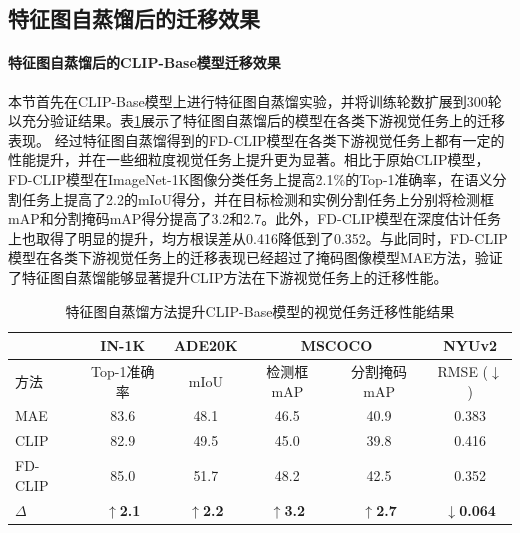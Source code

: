 \subsection{特征图自蒸馏后的迁移效果}
\label{sec:fd-exp-clip}
\paragraph{特征图自蒸馏后的CLIP-Base模型迁移效果} 本节首先在CLIP-Base模型上进行特征图自蒸馏实验，并将训练轮数扩展到300轮以充分验证结果。表\ref{tab:fd-clip_FD}展示了特征图自蒸馏后的模型在各类下游视觉任务上的迁移表现。
经过特征图自蒸馏得到的FD-CLIP模型在各类下游视觉任务上都有一定的性能提升，并在一些细粒度视觉任务上提升更为显著。相比于原始CLIP模型，FD-CLIP模型在ImageNet-1K图像分类任务上提高2.1\%的Top-1准确率，在语义分割任务上提高了2.2的mIoU得分，并在目标检测和实例分割任务上分别将检测框mAP和分割掩码mAP得分提高了3.2和2.7。此外，FD-CLIP模型在深度估计任务上也取得了明显的提升，均方根误差从0.416降低到了0.352。与此同时，FD-CLIP模型在各类下游视觉任务上的迁移表现已经超过了掩码图像模型MAE方法，验证了特征图自蒸馏能够显著提升CLIP方法在下游视觉任务上的迁移性能。

\begin{table}
\caption{特征图自蒸馏方法提升CLIP-Base模型的视觉任务迁移性能结果
}
\centering
  \begin{tabular}{lccccc}
\toprule
   & IN-1K & ADE20K & \multicolumn{2}{c}{MSCOCO} & NYUv2 \\
   \midrule
方法    &   Top-1准确率 &  mIoU  & 检测框mAP & 分割掩码mAP & RMSE\scriptsize{ ($\downarrow$)}\\
  \midrule
  MAE & 83.6 & 48.1 & 46.5 & 40.9 & 0.383 \\

  \midrule
  
  CLIP & 82.9  & 49.5 & 45.0 & 39.8 & 0.416 \\
  FD-CLIP & 85.0  & 51.7 & 48.2 & 42.5 & 0.352 \\
  $\Delta$ & \textbf{$\uparrow$2.1}  &  \textbf{$\uparrow$2.2} & \textbf{$\uparrow$3.2} & \textbf{$\uparrow$2.7} & \textbf{$\downarrow$0.064}\\
\bottomrule
  \end{tabular}
\label{tab:fd-clip_FD}
\end{table}

